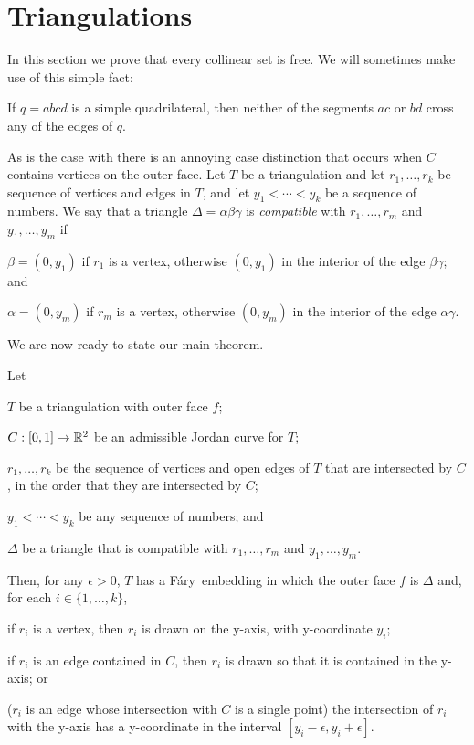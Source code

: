 \documentclass{patmorin}
\newcommand{\Fary}{Fáry}
\begin{document}
\section{Triangulations}

In this section we prove that every collinear set is free.
We will sometimes make use of this simple fact:
\begin{obs}
  If $q=abcd$ is a simple quadrilateral, then neither of the segments $ac$
  or $bd$ cross any of the edges of $q$.
\end{obs}

As is the case with  there is an annoying case distinction
that occurs when $C$ contains vertices on the outer face.  Let $T$
be a triangulation and let $r_1,\ldots,r_k$ be sequence of vertices
and edges in $T$, and let $y_1<\cdots<y_k$ be a sequence of numbers.
We say that a triangle $\Delta=\alpha\beta\gamma$ is \emph{compatible}
with $r_1,\ldots,r_m$ and $y_1,\ldots,y_m$ if
\begin{compactenum}
  \item $\beta=(0,y_1)$ if $r_1$ is a vertex, otherwise $(0, y_1)$ in the interior
  of the edge $\beta\gamma$; and
  \item $\alpha=(0,y_m)$ if $r_m$ is a vertex, otherwise $(0,y_m)$ in the interior
  of the edge $\alpha\gamma$.
\end{compactenum}

We are now ready to state our main theorem.

\begin{thm}
   Let
   \begin{compactenum}
     \item  $T$ be a triangulation with outer face $f$;
     \item  $C:[0,1]\to\mathbb{R}^2$ be an admissible Jordan curve for $T$;
     \item $r_1,\ldots,r_k$ be the sequence of vertices and open edges
           of $T$ that are intersected by $C$, in the order
           that they are intersected by $C$;
     \item $y_1<\cdots<y_k$ be any sequence of numbers; and
     \item $\Delta$ be a triangle that is compatible with 
           $r_1,\ldots,r_m$ and $y_1,\ldots,y_m$.
  \end{compactenum}
   Then, for any $\epsilon>0$, $T$ has a
   \Fary\ embedding in which the outer face $f$ is $\Delta$
   and, for each $i\in\{1,\ldots,k\}$, 
   \begin{compactenum}
       \item if $r_i$ is a vertex, then $r_i$ is drawn on the y-axis, with y-coordinate $y_i$;
       \item if $r_i$ is an edge contained in $C$, then $r_i$ is drawn so that
         it is contained in the y-axis; or
       \item ($r_i$ is an edge whose intersection with $C$ is a single point) 
         the intersection of $r_i$ with the
         y-axis has a y-coordinate in the interval
         $[y_i-\epsilon,y_i+\epsilon]$.
   \end{compactenum}
\end{thm}
\end{document}
